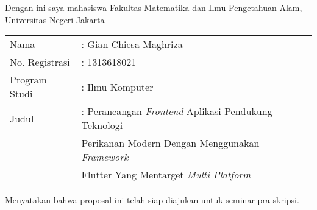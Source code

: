 \chapter*{}
\thispagestyle{empty} {\bf }Dengan ini saya mahasiswa Fakultas
Matematika dan Ilmu Pengetahuan Alam, Universitas Negeri Jakarta

\vskip3mm

\begin{tabular}{ll}
  Nama & : Gian Chiesa Maghriza \\
  No. Registrasi & : 1313618021 \\
  Program Studi & : Ilmu Komputer \\
  Judul & :  Perancangan \textit{Frontend} Aplikasi Pendukung Teknologi \\ & \hspace{0.2cm} Perikanan Modern Dengan Menggunakan \textit{Framework}\\ & \hspace{0.2cm} Flutter Yang Mentarget \textit{Multi Platform}\\
\end{tabular}

\vskip3mm

\noindent \hskip10mm Menyatakan bahwa proposal ini telah siap diajukan untuk seminar pra skripsi.



